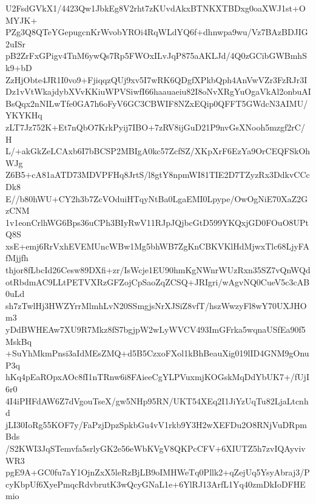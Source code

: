 U2FsdGVkX1/4423Qw1JbkEg8V2rht7zKUvdAkxBTNKXTBDxg0oaXWJ1st+OMYJK+
PZg3Q8QTeYGepugcnKrWvobYROi4RqWLdYQ6f+dhnwpa9wu/Vz7BAzBDJIG2uISr
pB2ZrFxGPigv4TnM6ywQs7Rp5FWOxILvJqP875aAKLJd/4Q0zGCibGWBmhSk9+bD
ZzHjObte4JR1I0vo9+FjiqqzQUj9xv5I7wRK6QDgfXPkbQph4AnVwVZr3FzRJr3I
Dz1vVtWkajdybXVvKKiuWPVSiwfI66haauaeiu82I8oNvXRgYuOgaVkAl2onbuAI
BsQqx2nNILwTfe0GA7h6oFyV6GC3CBWIF8NZxEQip0QFFT5GWdcN3AIMU/YKYKHq
zLT7Jz752K+Et7nQbO7KrkPyij7IBO+7zRV8ijGuD21P9nvGsXNooh5mzgf2rC/H
L/+akGkZeLCAxb6I7bBCSP2MBIgA0kc57ZcfSZ/XKpXrF6EzYa9OrCEQFSkOhWJg
Z6B5+cA81aATD73MDVPFHq8JrtS/l8gtY8npmWI81TIE2D7TZyzRx3DdkvCCcDk8
E//b80hWU+CY2h3b7ZcVOduiHTqyNtBa0LgaEMI0Lpype/OwOgNiE70XaZ2GzCNM
1v1eonCrlhWG6Bps36uCPh3BIyRwV11RJpJQjbcGtD599YKQxjGD0FOuO8UPtQ8S
xsE+emj6RrVxhEVEMUncWBw1Mg5bhWB7ZgKnCBKVKlHdMjwxTlc68LjyFAfMjjfh
thjor8fLbcId26Cesw89DXfi+zr/IsWcje1EU90hmKgNWnrWUzRxn35SZ7vQnWQd
otRbdmAC9LLtPETVXRzGFZojCpSaoZqZCSQ+JRIgri/wAgvNQ0CueV5c3cAB0uLd
sh7zTwlHj3HWZYrrMlmhLvN20SSmgjsNrXJSiZ8vfT/hszWwzyFl8wY70UXJHOm3
yDdBWHEAw7XU9R7Mkz8fS7bgjpW2wLyWVCV493ImGFrka5wqnaUSfEa90f5MskBq
+SuYhMkmPnsi3aIdMEsZMQ+d5B5CzxoFXol1kBhBeauXig019lID4GNM9gOnuP3q
hKq4pEaROpxAOc8fI1nTRnw6i8FAieeCgYLPVuxmjKOGskMqDdYbUK7+/fUjI6r0
4I4iPHFdAW6Z7dVgouTseX/gw5NHp95RN/UKT54XEq2I1JiYzUqTu82LjaLtcnhd
jLI30IoRg55KOF7y/FaPzjDpzSpkbGu4vV1rkb9Y3H2wXEFDu2O8RNjVuDRpmBds
/S2KWI3JqSTemvfa5srlyGK2e56eWbKVgV8QKPcCFV+6XIUTZ5h7zvIQAyvivWR3
pgE9A+GC0fu7aY1OjnZxX5leRzBjLB9oIMHWeTq0Pllk2+qZejUq5YsyAbraj3/P
cyKbpUf6XyePmqcRdvbrutK3wQcyGNaL1e+6YlRJ13ArfL1Yq40zmDkIoDFHEmio
